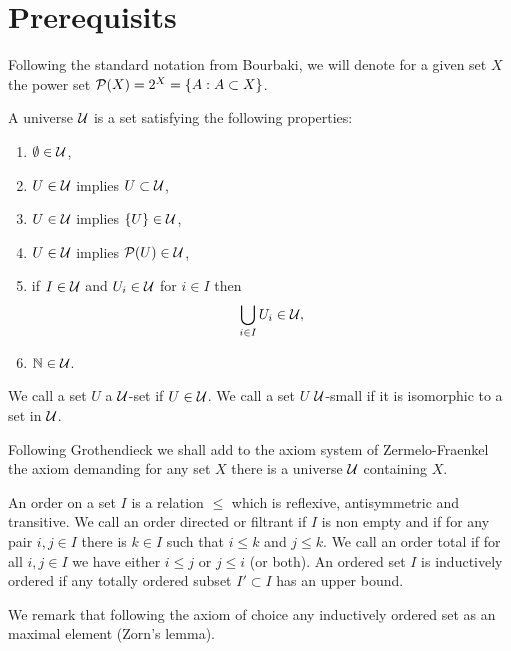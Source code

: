 
\section{Prerequisits}

Following the standard notation from Bourbaki, we will denote for a given set $X$ the power set $\mathcal{P}(X) = 2^X = \{A : A \subset X\}$.
\begin{defi}
A universe $\mathcal{U}$ is a set satisfying the following properties:
\begin{enumerate}
\item $\emptyset \in \mathcal{U}$,
\item $U \in \mathcal{U}$ implies $U \subset \mathcal{U}$,
\item $U \in \mathcal{U}$ implies $\{U\} \in \mathcal{U}$,
\item $U \in \mathcal{U}$ implies $\mathcal{P}(U) \in \mathcal{U}$,
\item if $I \in \mathcal{U}$ and $U_i \in \mathcal{U}$ for $i \in I$ then
$$\bigcup_{i \in I} U_i \in \mathcal{U},$$
\item $\mathbb{N} \in \mathcal{U}$.
\end{enumerate}
We call a set $U$ a $\mathcal{U}$-set if $U \in \mathcal{U}$. We call a set $U$ $\mathcal{U}$-small if it is isomorphic to a set in $\mathcal{U}$.
\end{defi}
Following Grothendieck we shall add to the axiom system of Zermelo-Fraenkel the axiom demanding for any set $X$ there is a universe $\mathcal{U}$ containing $X$.
\begin{defi}
An order on a set $I$ is a relation $\leq$ which is reflexive, antisymmetric and transitive. We call an order directed or filtrant if $I$ is non empty and if for any pair $i, j \in I$ there is $k \in I$ such that $i \leq k$ and $j \leq k$. We call an order total if for all $i, j \in I$ we have either $i \leq j$ or $j \leq i$ (or both). An ordered set $I$ is inductively ordered if any totally ordered subset $I' \subset I$ has an upper bound. 
\end{defi}
We remark that following the axiom of choice any inductively ordered set as an maximal element (Zorn's lemma).

